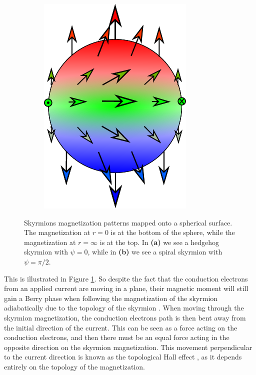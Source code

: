 \begin{figure}[h!]
\begin{subfigure}{.35\textwidth}
  \includegraphics[width=1.0\linewidth]{Figures/SpiralSphere}
  \caption{}
\end{subfigure}
\caption{Skyrmions magnetization patterns mapped onto a spherical surface. The magnetization at $r=0$ is at the bottom of the sphere, while the magnetization at $r=\infty$ is at the top. In \textbf{(a)} we see a hedgehog skyrmion with $\psi = 0$, while in \textbf{(b)} we see a spiral skyrmion with $\psi = \pi/2$.}
\label{fig:SkyrmionSphere}
\end{figure}
This is illustrated in Figure \ref{fig:SkyrmionSphere}. So despite the fact that the conduction electrons from an applied current are moving in a plane, their magnetic moment will still gain a Berry phase when following the magnetization of the skyrmion adiabatically due to the topology of the skyrmion \cite{Tatara2007, Binz2008}. When moving through the skyrmion magnetization, the conduction electrons path is then bent away from the initial direction of the current. This can be seen as a force acting on the conduction electrons, and then there must be an equal force acting in the opposite direction on the skyrmion magnetization. This movement perpendicular to the current direction is known as the topological Hall effect \cite{Ye1999}, as it depends entirely on the topology of the magnetization.

